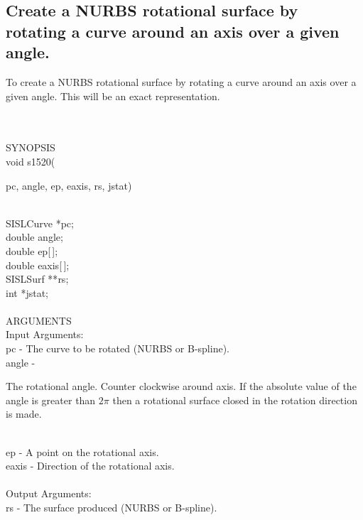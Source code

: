 \subsection{Create a NURBS rotational surface by rotating
a curve around an axis over a given angle.}
\begin{minipg1}
  To create a NURBS rotational surface by rotating
  a curve around an axis over a given angle.
  This will be an exact representation.
\end{minipg1} \\ \\
SYNOPSIS\\
        \>void s1520(\begin{minipg3}
          {\fov pc},  {\fov angle},  {\fov ep},  {\fov eaxis},  {\fov rs},  {\fov jstat})
        \end{minipg3}\\[0.3ex]
        \>\>    SISLCurve \> *{\fov pc};\\
        \>\>    double    \> {\fov angle};\\
        \>\>    double    \> {\fov ep}[\,];\\
        \>\>    double    \> {\fov eaxis}[\,];\\
        \>\>    SISLSurf  \> **{\fov rs};\\
        \>\>    int       \> *{\fov jstat};\\
\\
ARGUMENTS\\
        \>Input Arguments:\\
        \>\>    {\fov pc}   \> - \> The curve to be rotated (NURBS or B-spline).\\
        \>\>    {\fov angle}\> - \>
        \begin{minipg2}
          The rotational angle. Counter clockwise around axis.
          If the absolute value of the angle is greater than
          $2\pi$ then a rotational surface closed in the
          rotation direction is made.
        \end{minipg2}\\[0.8ex]
        \>\>    {\fov ep} \> - \> A point on the rotational axis.\\
        \>\>    {\fov eaxis}\> - \> Direction of the rotational axis.\\
\\
        \>Output Arguments:\\
        \>\>    {\fov rs}\> - \> The surface produced (NURBS or B-spline).\\
